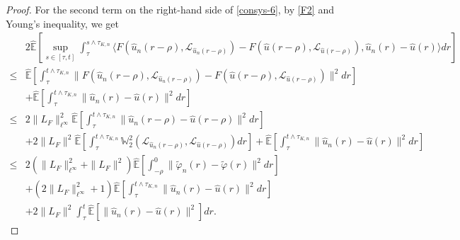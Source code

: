 \documentclass[10pt,a4paper]{amsart}
\begin{document}
\begin{proof}
  For the second term on the right-hand side of \eqref{consys-6},
  by \eqref{F2} and Young's inequality, we get
  \begin{align}\label{consys-8}
       & 2 \widehat{\mathbb{E}}
                \left[ \sup_{s \in [\tau,t]}
                          \int_{\tau}^{s \wedge \tau_{K,n}}
                              \langle F(\hat{u}_n(r-\rho), \mathcal{L}_{\hat{u}_n(r-\rho)})
                                      - F(\hat{u}(r-\rho), \mathcal{L}_{\hat{u}(r-\rho)}),
                                      \hat{u}_n(r) - \hat{u}(r)
                              \rangle dr
                \right] \nonumber\\
 \le & \widehat{\mathbb{E}}
               \left[ \int_{\tau}^{t \wedge \tau_{K,n}}
                            \| F(\hat{u}_n(r-\rho), \mathcal{L}_{\hat{u}_n(r-\rho)})
                               - F(\hat{u}(r-\rho), \mathcal{L}_{\hat{u}(r-\rho)})\|^2 dr
               \right]  \nonumber\\
      & + \widehat{\mathbb{E}}
                 \left[ \int_{\tau}^{t \wedge \tau_{K,n}}
                              \| \hat{u}_n(r) - \hat{u}(r) \|^2 dr
                 \right]  \nonumber\\
 \le & 2 \|L_F\|_{\ell^\infty}^2 \widehat{\mathbb{E}}
              \left[ \int_{\tau}^{t \wedge \tau_{K,n}}
                            \|\hat{u}_n(r-\rho) - \hat{u}(r-\rho)\|^2 dr
              \right]  \nonumber\\
      & + 2 \|L_F\|^2 \widehat{\mathbb{E}}
                \left[ \int_{\tau}^{t \wedge \tau_{K,n}}
                             \mathbb{W}_2^2(\mathcal{L}_{\hat{u}_n(r-\rho)},\mathcal{L}_{\hat{u}(r-\rho)} )dr
                \right]
          + \widehat{\mathbb{E}}
                 \left[ \int_{\tau}^{t \wedge \tau_{K,n}}
                              \| \hat{u}_n(r) - \hat{u}(r) \|^2 dr
                 \right]  \nonumber\\
 \le & 2 \left( \|L_F\|_{\ell^\infty}^2 + \|L_F\|^2 \right)
              \widehat{\mathbb{E}}
              \left[ \int_{-\rho}^{0}
                           \|\widetilde{\varphi}_n(r) - \widetilde{\varphi}(r)\|^2 dr
              \right]  \nonumber\\
      & + \left( 2 \|L_F\|_{\ell^\infty}^2  
          + 1 \right)
              \widehat{\mathbb{E}}
                    \left[ \int_{\tau}^{t \wedge \tau_{K,n}}
                              \| \hat{u}_n(r) - \hat{u}(r) \|^2 dr 
                    \right]  \nonumber\\
      & + 2 \|L_F\|^2  
                \int_{\tau}^{t  }
                    \widehat{\mathbb{E}}
                         \left[ \| \hat{u}_n(r) - \hat{u}(r) \|^2 \right] dr.
    \end{align}
 

\end{proof}
\end{document}
